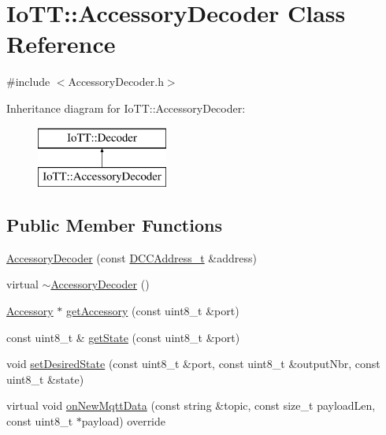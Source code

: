 \hypertarget{classIoTT_1_1AccessoryDecoder}{}\section{Io\+TT\+:\+:Accessory\+Decoder Class Reference}
\label{classIoTT_1_1AccessoryDecoder}


{\ttfamily \#include $<$Accessory\+Decoder.\+h$>$}

Inheritance diagram for Io\+TT\+:\+:Accessory\+Decoder\+:\begin{figure}[H]
\begin{center}
\leavevmode
\includegraphics[height=2.000000cm]{classIoTT_1_1AccessoryDecoder}
\end{center}
\end{figure}
\subsection*{Public Member Functions}
\begin{DoxyCompactItemize}
\item 
\hyperlink{classIoTT_1_1AccessoryDecoder_a5bc073b3c436232fc2b5679b6e5f0a25}{Accessory\+Decoder} (const \hyperlink{namespaceIoTT_a31b8cd9473fc447b3fb341b78afa54fe}{D\+C\+C\+Address\+\_\+t} \&address)
\item 
virtual \hyperlink{classIoTT_1_1AccessoryDecoder_ae0b1401a67215ab04b0ab5d8d57f1ad2}{$\sim$\+Accessory\+Decoder} ()
\item 
\hyperlink{classIoTT_1_1Accessory}{Accessory} $\ast$ \hyperlink{classIoTT_1_1AccessoryDecoder_a1c4752509a6899266356b8e05aa99a3f}{get\+Accessory} (const uint8\+\_\+t \&port)
\item 
const uint8\+\_\+t \& \hyperlink{classIoTT_1_1AccessoryDecoder_a9d59da3f409ce5eda4390a436bb878a4}{get\+State} (const uint8\+\_\+t \&port)
\item 
void \hyperlink{classIoTT_1_1AccessoryDecoder_a4ae58a047da846c4567d281ce4bf9b71}{set\+Desired\+State} (const uint8\+\_\+t \&port, const uint8\+\_\+t \&output\+Nbr, const uint8\+\_\+t \&state)
\item 
virtual void \hyperlink{classIoTT_1_1AccessoryDecoder_a2aefba75fd586b25e37f8ea03deda7e7}{on\+New\+Mqtt\+Data} (const string \&topic, const size\+\_\+t payload\+Len, const uint8\+\_\+t $\ast$payload) override
\end{DoxyCompactItemize}
